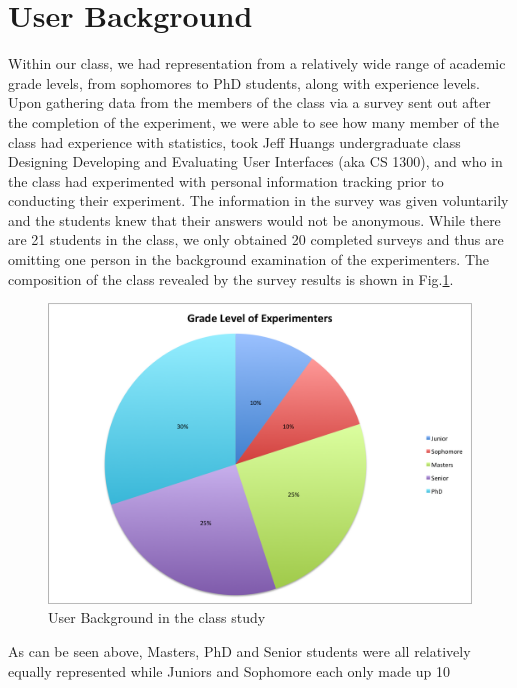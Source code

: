 \section{User Background}
Within our class, we had representation from a relatively wide range of academic grade levels, from sophomores to PhD students, along with experience levels.  Upon gathering data from the members of the class via a survey sent out after the completion of the experiment, we were able to see how many member of the class had experience with statistics, took Jeff Huang\textquotesingle s undergraduate class Designing Developing and Evaluating User Interfaces (aka CS 1300), and who in the class had experimented with personal information tracking prior to conducting their experiment.  The information in the survey was given voluntarily and the students knew that their answers would not be anonymous.  While there are 21 students in the class, we only obtained 20 completed surveys and thus are omitting one person in the background examination of the experimenters. The composition of the class revealed by the survey results is shown in Fig.\ref{fig:surveybc}.  

\begin{figure}[!t]\centering
\includegraphics[width=1.0\columnwidth]{images/Grade_Level_of_Experimenters.png}
\caption{\footnotesize User Background in the class study \label{fig:surveybc} 
}%
\end{figure}

As can be seen above,  Masters, PhD and Senior students were all relatively equally represented while Juniors and Sophomore each only made up 10%

